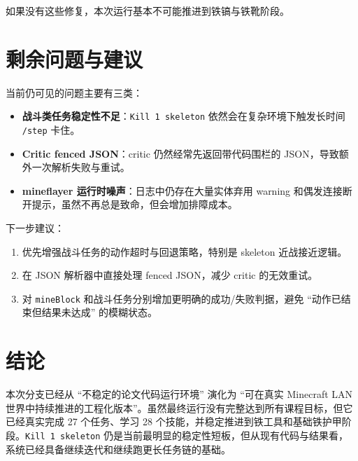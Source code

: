 \documentclass[11pt,a4paper]{ctexart}
\begin{document}
如果没有这些修复，本次运行基本不可能推进到铁镐与铁靴阶段。

\section{剩余问题与建议}

当前仍可见的问题主要有三类：

\begin{itemize}
  \item \textbf{战斗类任务稳定性不足}：\texttt{Kill 1 skeleton} 依然会在复杂环境下触发长时间 \texttt{/step} 卡住。
  \item \textbf{Critic fenced JSON}：critic 仍然经常先返回带代码围栏的 JSON，导致额外一次解析失败与重试。
  \item \textbf{mineflayer 运行时噪声}：日志中仍存在大量实体弃用 warning 和偶发连接断开提示，虽然不再总是致命，但会增加排障成本。
\end{itemize}

下一步建议：

\begin{enumerate}
  \item 优先增强战斗任务的动作超时与回退策略，特别是 skeleton 近战接近逻辑。
  \item 在 JSON 解析器中直接处理 fenced JSON，减少 critic 的无效重试。
  \item 对 \texttt{mineBlock} 和战斗任务分别增加更明确的成功/失败判据，避免 ``动作已结束但结果未达成'' 的模糊状态。
\end{enumerate}

\section{结论}

本次分支已经从 ``不稳定的论文代码运行环境'' 演化为 ``可在真实 Minecraft LAN 世界中持续推进的工程化版本''。虽然最终运行没有完整达到所有课程目标，但它已经真实完成 27 个任务、学习 28 个技能，并稳定推进到铁工具和基础铁护甲阶段。\texttt{Kill 1 skeleton} 仍是当前最明显的稳定性短板，但从现有代码与结果看，系统已经具备继续迭代和继续跑更长任务链的基础。
\end{document}
